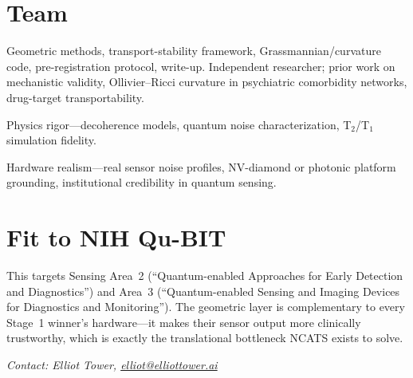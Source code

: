 \documentclass[11pt]{article}
\begin{document}
\section*{Team}

\begin{description}[leftmargin=!,labelwidth=2.5cm]
  \item[Elliot Tower] Geometric methods, transport-stability
    framework, Grassmannian/curvature code, pre-registration protocol,
    write-up.  Independent researcher; prior work on mechanistic
    validity, Ollivier--Ricci curvature in psychiatric comorbidity
    networks, drug-target transportability.
  \item[Nathan] Physics rigor---decoherence models, quantum noise
    characterization, T$_2$/T$_1$ simulation fidelity.
  \item[Ian (MIT-LL)] Hardware realism---real sensor noise profiles,
    NV-diamond or photonic platform grounding, institutional
    credibility in quantum sensing.
\end{description}

\section*{Fit to NIH Qu-BIT}

This targets Sensing Area~2 (``Quantum-enabled Approaches for Early
Detection and Diagnostics'') and Area~3 (``Quantum-enabled Sensing
and Imaging Devices for Diagnostics and Monitoring'').  The geometric
layer is complementary to every Stage~1 winner's hardware---it makes
their sensor output more clinically trustworthy, which is exactly the
translational bottleneck NCATS exists to solve.

\vfill
\noindent\textit{Contact: Elliot Tower,
  \href{mailto:elliot@elliottower.ai}{elliot@elliottower.ai}}
\end{document}
